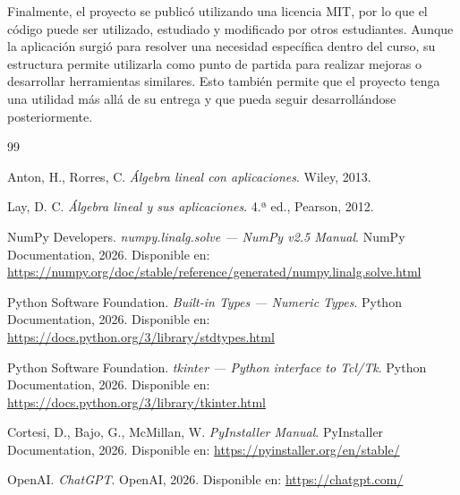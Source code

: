 \documentclass[12pt,a4paper]{article}
\begin{document}
Finalmente, el proyecto se publicó utilizando una licencia MIT, por lo que el código puede ser utilizado, estudiado y modificado por otros estudiantes. Aunque la aplicación surgió para resolver una necesidad específica dentro del curso, su estructura permite utilizarla como punto de partida para realizar mejoras o desarrollar herramientas similares. Esto también permite que el proyecto tenga una utilidad más allá de su entrega y que pueda seguir desarrollándose posteriormente.

\begin{thebibliography}{99}

Anton, H., Rorres, C. \textit{Álgebra lineal con aplicaciones}. Wiley, 2013.

Lay, D. C. \textit{Álgebra lineal y sus aplicaciones}. 4.ª ed., Pearson, 2012.

NumPy Developers. \textit{numpy.linalg.solve — NumPy v2.5 Manual}. NumPy Documentation, 2026. Disponible en: \url{https://numpy.org/doc/stable/reference/generated/numpy.linalg.solve.html}

Python Software Foundation. \textit{Built-in Types — Numeric Types}. Python Documentation, 2026. Disponible en: \url{https://docs.python.org/3/library/stdtypes.html}

Python Software Foundation. \textit{tkinter — Python interface to Tcl/Tk}. Python Documentation, 2026. Disponible en: \url{https://docs.python.org/3/library/tkinter.html}

Cortesi, D., Bajo, G., McMillan, W. \textit{PyInstaller Manual}. PyInstaller Documentation, 2026. Disponible en: \url{https://pyinstaller.org/en/stable/}

OpenAI. \textit{ChatGPT}. OpenAI, 2026. Disponible en: \url{https://chatgpt.com/}

\end{thebibliography}
\end{document}
